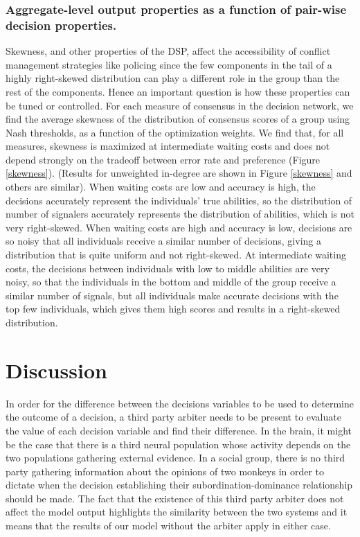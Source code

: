 \documentclass{pnastwo}
\begin{document}
\begin{article}
\subsubsection{Aggregate-level output properties as a function of pair-wise decision properties.}
Skewness, and other properties of the DSP, affect the accessibility of conflict management strategies like policing since the few components in the tail of a highly right-skewed distribution can play a different role in the group than the rest of the components. Hence an important question is how these properties can be tuned or controlled. For each measure of consensus in the decision network, we find the average skewness of the distribution of consensus scores of a group using Nash thresholds, as a function of the optimization weights. We find that, for all measures, skewness is maximized at intermediate waiting costs and does not depend strongly on the tradeoff between error rate and preference (Figure \ref{skewness}). (Results for unweighted in-degree are shown in Figure \ref{skewness} and others are similar).  When waiting costs are low and accuracy is high, the decisions accurately represent the individuals' true  abilities, so the distribution of number of signalers accurately represents the distribution of abilities, which is not very right-skewed.  When waiting costs are high and accuracy is low, decisions are so noisy that all individuals receive a similar number of decisions, giving a distribution that is quite uniform and not right-skewed.  At intermediate waiting costs, the decisions between individuals with low to middle abilities are very noisy, so that the individuals in the bottom and middle of the group receive a similar number of signals, but all individuals make accurate decisions with the top few individuals, which gives them high scores and results in a right-skewed distribution.

\section{Discussion}
In order for the difference between the decisions variables to be used to determine the outcome of a decision, a third party arbiter needs to be present to evaluate the value of each decision variable and find their difference.  In the brain, it might be the case that there is a third neural population whose activity depends on the two populations gathering external evidence. In a social group, there is no third party gathering information about the opinions of two monkeys in order to dictate when the decision establishing their subordination-dominance relationship should be made.  The fact that the existence of this third party arbiter does not affect the model output highlights the similarity between the two systems and it means that the results of our model without the arbiter apply in either case.


\end{article}
\end{document}
